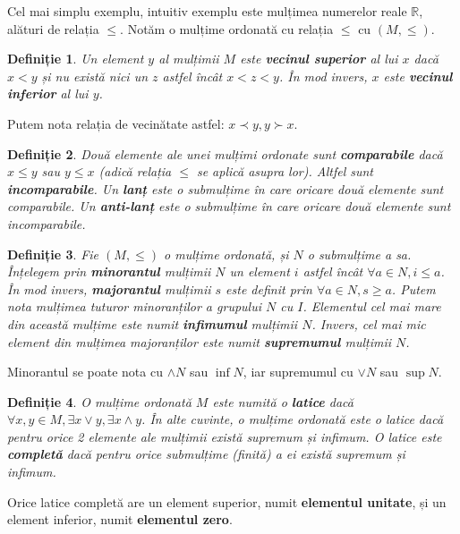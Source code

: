 \documentclass[12pt, a4paper, twoside, romanian]{teza-upb}
\newtheorem{defn}{Definiție}
\begin{document}
    Cel mai simplu exemplu, intuitiv exemplu este mulțimea numerelor reale $ \mathbb{R}$, alături de relația $\le$. Notăm o mulțime ordonată cu relația $\le$ cu $(M, \le)$.

    \begin{defn}
      Un element $y$ al mulțimii $M$ este \textbf{vecinul superior} al lui $x$ dacă $x < y$ și nu există nici un $z$ astfel încât $x < z < y$. În mod invers, $x$ este \textbf{vecinul inferior} al lui $y$.
    \end{defn}

    Putem nota relația de vecinătate astfel: $x \prec y, y \succ x$.

    \begin{defn}
      Două elemente ale unei mulțimi ordonate sunt \textbf{comparabile} dacă $x \le y$ sau $y \le x$ (adică relația $\le$ se aplică asupra lor). Altfel sunt \textbf{incomparabile}. Un \textbf{lanț} este o submulțime în care oricare două elemente sunt comparabile. Un \textbf{anti-lanț} este o submulțime în care oricare două elemente sunt incomparabile.
    \end{defn}

    \begin{defn}
      Fie $(M, \le)$ o mulțime ordonată, și $N$ o submulțime a sa. Înțelegem prin \textbf{minorantul} mulțimii $N$ un element $i$ astfel încât $\forall a \in N, i \le a$. În mod invers, \textbf{majorantul} mulțimii $s$ este definit prin $\forall a \in N, s \ge a$.
      Putem nota mulțimea tuturor minoranților a grupului $N$ cu $I$. Elementul cel mai mare din această mulțime este numit \textbf{infimumul} mulțimii $N$. Invers, cel mai mic element din mulțimea majoranților este numit \textbf{supremumul} mulțimii $N$.
    \end{defn}

    Minorantul se poate nota cu $\wedge N$ sau $\inf N$, iar supremumul cu $\vee N$ sau $\sup N$.

    \begin{defn}
      O mulțime ordonată $M$ este numită o \textbf{latice} dacă $\forall x,y \in M, \exists x \vee y, \exists x \wedge y$. În alte cuvinte, o mulțime ordonată este o latice dacă pentru orice 2 elemente ale mulțimii există supremum și infimum. O latice este \textbf{completă} dacă pentru orice submulțime (finită) a ei există supremum și infimum.
    \end{defn}

    Orice latice completă are un element superior, numit \textbf{elementul unitate}, și un element inferior, numit \textbf{elementul zero}.
\end{document}

